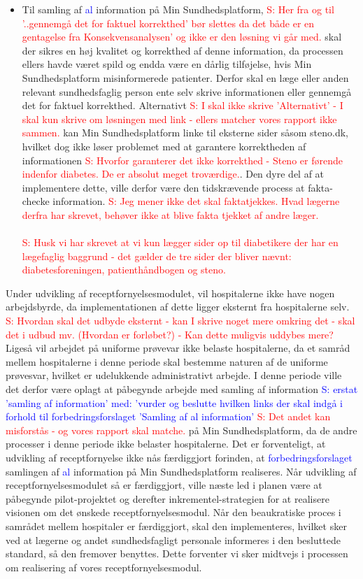 \begin{itemize}
{}
	\item Til samling af 
	\textcolor{blue}{al} information på Min Sundhedsplatform, \textcolor{red}{S: Her fra og til '..gennemgå det for faktuel korrekthed' bør slettes da det både er en gentagelse fra Konsekvensanalysen' og ikke er den løsning vi går med.} skal der sikres en høj kvalitet og korrekthed af denne information, da processen ellers havde været spild og endda være en dårlig tilføjelse, hvis Min Sundhedsplatform misinformerede patienter. Derfor skal en læge eller anden relevant sundhedsfaglig person ente selv skrive informationen eller gennemgå det for faktuel korrekthed. Alternativt \textcolor{red}{S: I skal ikke skrive 'Alternativt' - I skal kun skrive om løsningen med link - ellers matcher vores rapport ikke sammen.}  kan Min Sundhedsplatform linke til eksterne sider såsom steno.dk, hvilket dog ikke løser problemet med at garantere korrektheden af informationen
	\textcolor{red}{S: Hvorfor garanterer det ikke korrekthed - Steno er førende indenfor diabetes. De er absolut meget troværdige.}. Den dyre del af at implementere dette, ville derfor være den tidskrævende process at fakta-checke information.
	\textcolor{red}{S: Jeg mener ikke det skal faktatjekkes. Hvad lægerne derfra har skrevet, behøver ikke at blive fakta tjekket af andre læger.
	}
\textcolor{red}{\\\\S: Husk vi har skrevet at vi kun lægger sider op til diabetikere der har en lægefaglig baggrund - det gælder de tre sider der bliver nævnt: diabetesforeningen, patienthåndbogen og steno.}
\end{itemize}
Under udvikling af receptfornyelsesmodulet, vil hospitalerne ikke have nogen arbejdsbyrde, da implementationen af dette ligger eksternt fra hospitalerne selv.
\textcolor{red}{S: Hvordan skal det udbyde eksternt - kan I skrive noget mere omkring det - skal det i udbud mv. (Hvordan er forløbet?) - Kan dette muligvis uddybes mere?} Ligeså vil arbejdet på uniforme prøvevar ikke belaste hospitalerne, da et samråd mellem hospitalerne i denne periode skal bestemme naturen af de uniforme prøvesvar, hvilket er udelukkende administrativt arbejde. I denne periode ville det derfor være oplagt at påbegynde arbejde med samling af information
\textcolor{blue}{S: erstat 'samling af information' med: 'vurder og beslutte hvilken links der skal indgå i forhold til forbedringsforslaget 'Samling af al information'}
\textcolor{red}{S: Det andet kan misforstås - og vores rapport skal matche.}
 på Min Sundhedsplatform, da de andre processer i denne periode ikke belaster hospitalerne. Det er forventeligt, at udvikling af receptfornyelse ikke nås færdiggjort forinden, at 
 \textcolor{blue}{forbedringsforslaget} samlingen af 
 \textcolor{blue}{al} information på Min Sundhedsplatform realiseres. Når udvikling af receptfornyelsesmodulet så er færdiggjort, ville næste led i planen være at påbegynde pilot-projektet og derefter inkrementel-strategien for at realisere visionen om det ønskede receptfornyelsesmodul.
Når den beaukratiske proces i samrådet mellem hospitaler er færdiggjort, skal den implementeres, hvilket sker ved at lægerne og andet sundhedsfagligt personale informeres i den besluttede standard, så den fremover benyttes. Dette forventer vi sker midtvejs i processen om realisering af vores receptfornyelsesmodul.
